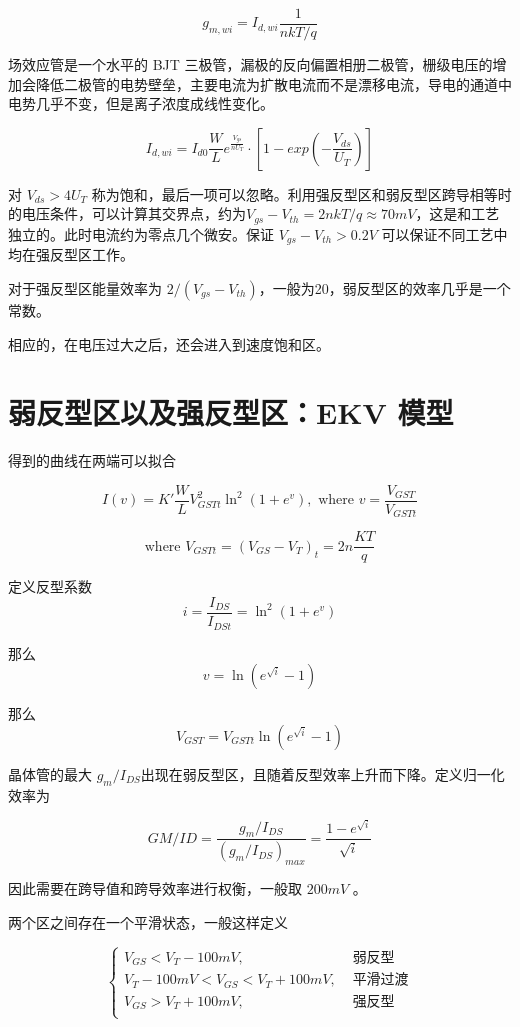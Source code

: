 \documentclass[cn,11pt,chinese,black,simple]{../elegantbook}
\begin{document}
\[g_{m,wi} = I_{d,wi} \frac{1}{n k T / q}\]

场效应管是一个水平的 BJT 三极管，漏极的反向偏置相册二极管，栅级电压的增加会降低二极管的电势壁垒，主要电流为扩散电流而不是漂移电流，导电的通道中电势几乎不变，但是离子浓度成线性变化。

\[I_{d,wi} = I_{d0} \frac{W}{L} e^{\frac{V_{gs}}{nU_T}} \cdot \left[1 - exp(-\frac{V_{ds}}{U_T})\right]\] 

对 \(V_{ds} > 4 U_T\) 称为饱和，最后一项可以忽略。利用强反型区和弱反型区跨导相等时的电压条件，可以计算其交界点，约为\(V_{gs}-V_{th} = 2 n k T / q \approx 70 mV \)，这是和工艺独立的。此时电流约为零点几个微安。保证 \(V_{gs} - V_{th} > 0.2 V\) 可以保证不同工艺中均在强反型区工作。

对于强反型区能量效率为 \(2 / (V_{gs}-V_{th})\)，一般为20，弱反型区的效率几乎是一个常数。

相应的，在电压过大之后，还会进入到速度饱和区。

\section{弱反型区以及强反型区：EKV 模型}

得到的曲线在两端可以拟合

\[I(v) = K' \frac{W}{L} V_{GSTt}^2 \ln^2(1 + e^v), \text{ where } v = \frac{V_{{GST}}}{V_{GSTt}}\]

\[\text{where } V_{GSTt} = (V_{GS}-V_T)_t = 2n\frac{KT}{q}\]

定义反型系数\[i = \frac{I_{DS}}{I_{DSt}} = \ln^2(1+e^v)\]

那么\[v = \ln(e^{\sqrt{i}}-1)\]

那么\[V_{GST}=V_{GSTt} \ln(e^{\sqrt{i}}-1) \]

晶体管的最大 \(g_m/I_{DS}\)出现在弱反型区，且随着反型效率上升而下降。定义归一化效率为

\[GM/ID = \frac{g_m/I_{DS}}{(g_m/I_{DS})_{max}} = \frac{1-e^{\sqrt{i}}}{\sqrt{i}}\]

因此需要在跨导值和跨导效率进行权衡，一般取 \(200 mV\) 。

两个区之间存在一个平滑状态，一般这样定义

\[\left\{\begin{aligned}
    V_{GS} < V_{T} - 100 mV, &\text{ 弱反型}\\
    V_{T} - 100 mV < V_{GS} < V_{T} + 100 mV, &\text{ 平滑过渡}\\
    V_{GS} > V_{T} + 100 mV, &\text{ 强反型}\\
\end{aligned}\right.\]
\end{document}
